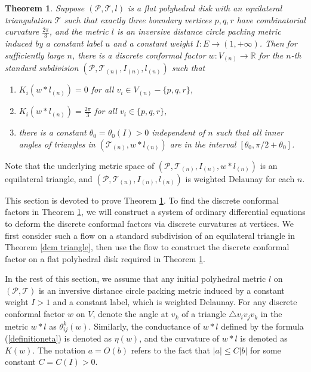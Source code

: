 \documentclass[12pt]{amsart}
\newtheorem{theorem}{Theorem}[section]
\def\R{\mathbb{R}}
\def\T{\mathcal{T}}
\begin{document}
\begin{theorem}
\label{exist}
Suppose $(\mathcal P, \T,  l)$ is a flat polyhedral disk with an equilateral triangulation $\T$
such that exactly three boundary vertices $p,q,r$ have combinatorial curvature $\frac{2\pi}{3}$,
and the metric $l$ is an inversive distance circle packing metric
induced by a constant label $u$ and a constant weight $I:E\rightarrow (1, +\infty)$.
	Then for sufficiently large $n$, there is a discrete conformal
	factor $w: V_{(n)}\to \R$ for the $n$-th standard subdivision
	$(\mathcal P, \T_{(n)}, I_{(n)}, l_{(n)} )$  such that
	\begin{enumerate}
	    \item $K_i(w*l_{(n)})=0$ for all $v_i \in V_{(n)}-\{p,q,r\}$,
	    \item $K_i(w*l_{(n)})=\frac{2\pi}{3}$ for all $v_i \in \{p,q,r\}$,
	    \item there is a constant $\theta_0 = \theta_0(I)>0$ independent of $n$ such that all inner angles of triangles in $(\T_{(n)}, w*l_{(n)})$ are in
	the interval $[\theta_0, \pi/2+\theta_0]$.
	\end{enumerate}
\end{theorem}

Note that the underlying metric space of $(\mathcal P, \T_{(n)}, I_{(n)},  w*l_{(n)} )$ is an equilateral triangle,
and $(\mathcal P, \T_{(n)}, I_{(n)},  l_{(n)} )$ is weighted Delaunay for each $n$.


This section is devoted to prove Theorem \ref{exist}. To find the discrete conformal factors in Theorem \ref{exist}, we will construct a system of ordinary differential equations to deform the discrete conformal factors via discrete curvatures at vertices. We first consider such a flow on a standard subdivision of an equilateral triangle in Theorem \ref{dcm triangle}, then use the flow to construct the discrete conformal factor on a flat polyhedral disk required in Theorem \ref{exist}.



In the rest of this section, we assume that any initial polyhedral metric $l$ on $(\mathcal{P},\mathcal{T})$ is an inversive distance circle packing metric induced by a constant weight $I>1$ and a constant label, which is weighted Delaunay. For any discrete conformal factor $w$ on $V$, denote the angle at $v_k$ of a triangle $\triangle v_iv_jv_k$ in the metric $w*l$ as $\theta_{ij}^k(w)$. Similarly, the conductance of $w*l$ defined by the formula (\ref{definitioneta}) is denoted as $\eta(w)$, and the curvature of $w*l$ is denoted as $K(w)$. The notation $a = O(b)$ refers to the fact that $|a| \leq C|b|$ for some constant $C = C(I)>0$.
\end{document}
